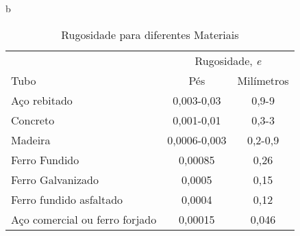    \begin{table}{b}
        \centering
        \caption{Rugosidade para diferentes Materiais}
        \begin{tabular}{l c c} \toprule
            & \multicolumn{2}{c}{Rugosidade, \textit{e}} \\
            \cline{2-3}
            Tubo  & Pés & Milímetros \\
            \hline
            Aço rebitado & 0,003-0,03 & 0,9-9 \\
            Concreto & 0,001-0,01 & 0,3-3 \\
            Madeira & 0,0006-0,003 & 0,2-0,9 \\
            Ferro Fundido & 0,00085 & 0,26 \\
            Ferro Galvanizado & 0,0005 & 0,15 \\
            Ferro fundido asfaltado & 0,0004 & 0,12 \\
            Aço comercial ou ferro forjado & 0,00015 & 0,046 \\
            \bottomrule
        \end{tabular}
    \end{table}
